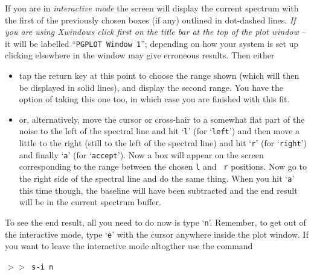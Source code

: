 \documentclass[11pt,twoside]{article}
\newcommand{\SP}{{$>\!>$}}
\begin{document}
If you are in {\it interactive mode} the screen will display the current
spectrum with the first of the previously chosen boxes (if any)
outlined in dot-dashed lines. {\it If you are using Xwindows click
first on the title bar at the top of the plot window} -- it will be
labelled ``{\tt{PGPLOT Window 1}}''; depending on how your system is
set up clicking elsewhere in the window may give erroneous results. 
Then either 
\begin{itemize}
\item
tap the return key at this point to choose the range shown (which will
then be displayed in solid lines), and display the second range. You
have the option of taking this one too, in which case you are finished
with this fit.
\item
or, alternatively, move the cursor or cross-hair to a somewhat flat
part of the noise to the left of the spectral line and hit `{\tt{l}}'
(for `{\tt{left}}') and then move a little to the right (still to the
left of the spectral line) and hit `{\tt{r}}' (for `{\tt{right}}') and
finally `{\tt{a}}' (for `{\tt{accept}}').  Now a box will appear on the
screen corresponding to the range between the chosen {\tt l} and {\tt
r} positions.  Now go to the right side of the spectral line and do
the same thing.  When you hit `{\tt{a}}' this time though, the baseline
will have been subtracted and the end result will be in the current
spectrum buffer.
\end{itemize}
To see the end result, all you need to do now is type `{\tt{n}}'.
Remember, to get out of the interactive mode, type `{\tt{e}}' with the
cursor anywhere inside the plot window. If you want to leave the
interactive mode altogther use the command

\SP\ \verb|s-i n|
 
\end{document}
